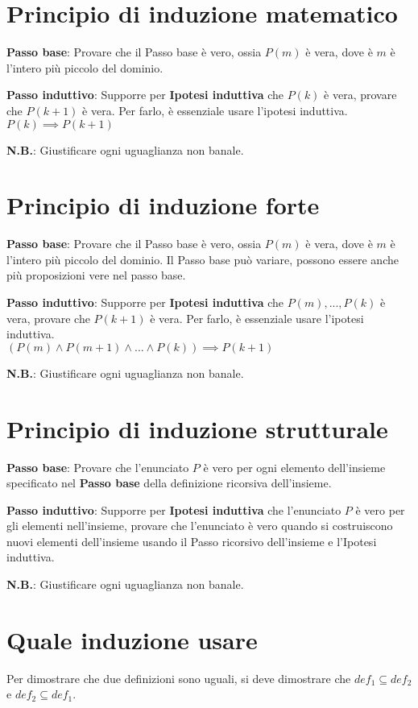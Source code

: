 \section{Principio di induzione matematico}
\textbf{Passo base}: Provare che il Passo base è vero, ossia $P(m)$ è vera, dove è $m$ è l'intero più piccolo del dominio.

\textbf{Passo induttivo}: Supporre per \textbf{Ipotesi induttiva} che $P(k)$ è vera, provare che $P(k + 1)$ è vera. Per farlo, è essenziale usare l'ipotesi induttiva. \\
$P(k) \implies P(k+1)$

\textbf{N.B.}: Giustificare ogni uguaglianza non banale.

\section{Principio di induzione forte}
\textbf{Passo base}:  Provare che il Passo base è vero, ossia $P(m)$ è vera, dove è $m$ è l'intero più piccolo del dominio. Il Passo base può variare, possono essere anche più proposizioni vere nel passo base.

\textbf{Passo induttivo}: Supporre per \textbf{Ipotesi induttiva}  che $P(m), ..., P(k)$ è vera, provare che $P(k + 1)$ è vera. Per farlo, è essenziale usare l'ipotesi induttiva. \\
$(P(m) \wedge P(m+1) \wedge ... \wedge P(k)) \implies P(k+1)$

\textbf{N.B.}: Giustificare ogni uguaglianza non banale.

\section{Principio di induzione strutturale}
\textbf{Passo base}: Provare che l'enunciato $P$ è vero per ogni elemento dell'insieme specificato nel \textbf{Passo base} della definizione ricorsiva dell'insieme.

\textbf{Passo induttivo}: Supporre per \textbf{Ipotesi induttiva} che l'enunciato $P$ è vero per gli elementi nell'insieme, provare che l'enunciato è vero quando si costruiscono nuovi elementi dell'insieme usando il Passo ricorsivo dell'insieme e l'Ipotesi induttiva.

\textbf{N.B.}: Giustificare ogni uguaglianza non banale.

\section{Quale induzione usare}
Per dimostrare che due definizioni sono uguali, si deve dimostrare che $def_1 \subseteq def_2$ e $def_2 \subseteq def_1$.

